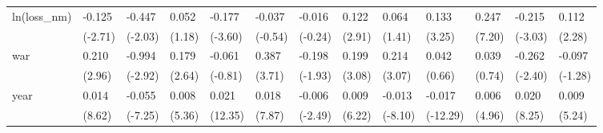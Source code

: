 \begin{tabular}{p{1.5cm} p{1.7cm} p{1.7cm} p{1.7cm} p{1.7cm} p{1.7cm} p{1.7cm} p{1.7cm} p{1.7cm} p{1.7cm} p{1.7cm} p{1.7cm} p{1.7cm}}
\hline
ln(loss\_nm)     &   -0.125\sym{**} &   -0.447\sym{*}  &    0.052         &   -0.177\sym{***}&   -0.037         &   -0.016         &    0.122\sym{**} &    0.064         &    0.133\sym{**} &    0.247\sym{***}&   -0.215\sym{**} &    0.112\sym{*}  \\
                &  (-2.71)         &  (-2.03)         &   (1.18)         &  (-3.60)         &  (-0.54)         &  (-0.24)         &   (2.91)         &   (1.41)         &   (3.25)         &   (7.20)         &  (-3.03)         &   (2.28)         \\
war             &    0.210\sym{**} &   -0.994\sym{**} &    0.179\sym{*}  &   -0.061         &    0.387\sym{***}&   -0.198         &    0.199\sym{**} &    0.214\sym{**} &    0.042         &    0.039         &   -0.262\sym{*}  &   -0.097         \\
                &   (2.96)         &  (-2.92)         &   (2.64)         &  (-0.81)         &   (3.71)         &  (-1.93)         &   (3.08)         &   (3.07)         &   (0.66)         &   (0.74)         &  (-2.40)         &  (-1.28)         \\
year            &    0.014\sym{***}&   -0.055\sym{***}&    0.008\sym{***}&    0.021\sym{***}&    0.018\sym{***}&   -0.006\sym{*}  &    0.009\sym{***}&   -0.013\sym{***}&   -0.017\sym{***}&    0.006\sym{***}&    0.020\sym{***}&    0.009\sym{***}\\
                &   (8.62)         &  (-7.25)         &   (5.36)         &  (12.35)         &   (7.87)         &  (-2.49)         &   (6.22)         &  (-8.10)         & (-12.29)         &   (4.96)         &   (8.25)         &   (5.24)         \\
\end{tabular}
